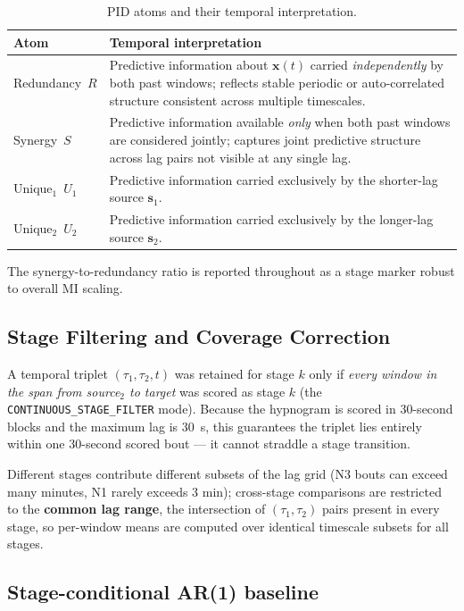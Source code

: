 \documentclass[11pt,a4paper]{article}
\begin{document}
\begin{table}[h]
\centering
\caption{PID atoms and their temporal interpretation.}
\label{tab:atoms}
\begin{tabular}{@{}lp{9cm}@{}}
\toprule
\textbf{Atom} & \textbf{Temporal interpretation} \\
\midrule
Redundancy~$R$ & Predictive information about $\mathbf{x}(t)$ carried
  \emph{independently} by both past windows; reflects stable periodic or
  auto-correlated structure consistent across multiple timescales. \\[4pt]
Synergy~$S$ & Predictive information available \emph{only} when both past
  windows are considered jointly; captures joint predictive structure across
  lag pairs not visible at any single lag. \\[4pt]
Unique$_1$~$U_1$ & Predictive information carried exclusively by the
  shorter-lag source $\mathbf{s}_1$. \\[4pt]
Unique$_2$~$U_2$ & Predictive information carried exclusively by the
  longer-lag source $\mathbf{s}_2$. \\
\bottomrule
\end{tabular}
\end{table}

The synergy-to-redundancy ratio is reported throughout as a stage marker
robust to overall MI scaling.

\subsection{Stage Filtering and Coverage Correction}

A temporal triplet $(\tau_1, \tau_2, t)$ was retained for stage $k$ only if
\emph{every window in the span from source$_2$ to target} was scored as stage
$k$ (the \texttt{CONTINUOUS\_STAGE\_FILTER} mode).  Because the hypnogram is
scored in 30-second blocks and the maximum lag is 30~s, this guarantees the
triplet lies entirely within one 30-second scored bout --- it cannot straddle
a stage transition.

Different stages contribute different subsets of the lag grid (N3 bouts can
exceed many minutes, N1 rarely exceeds 3 min); cross-stage comparisons are
restricted to the \textbf{common lag range}, the intersection of
$(\tau_1, \tau_2)$ pairs present in every stage, so per-window means are
computed over identical timescale subsets for all stages.

\subsection{Stage-conditional AR(1) baseline}
\label{sec:ar1}
\end{document}
